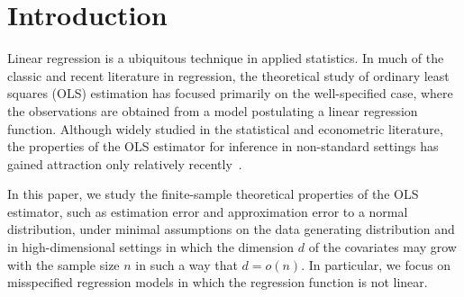 \documentclass{article}
\begin{document}
 
 
 
 
 
 
 
 
 
 
 
 
 
 
 
 
 \section{Introduction}
 Linear regression is a ubiquitous technique in applied statistics. In much of the classic and recent literature in regression, the theoretical study of ordinary least squares (OLS) estimation has focused primarily on the well-specified case, where the observations are obtained from a model postulating a linear regression function. Although widely studied in the statistical and econometric literature, the properties of the OLS estimator for inference in non-standard settings has gained attraction only relatively recently~\citep{Buja14,Buja16,Uniform:Kuch18}.
 
 In this paper, we study the finite-sample theoretical properties of the OLS estimator, such as estimation error and approximation error to a normal distribution, under minimal assumptions on the data generating distribution and in high-dimensional settings in which the dimension $d$ of the covariates may grow with the sample size $n$ in such a way that $d = o(n)$. In particular, we focus on misspecified regression models in which the regression function is not linear.
 
 
 
\end{document}

